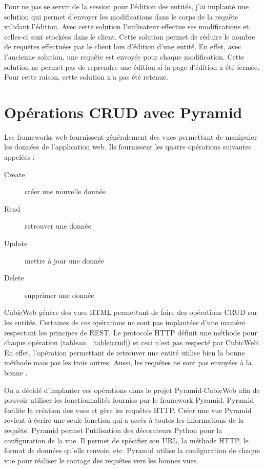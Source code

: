 Pour ne pas se servir de la session pour l'édition des entités, j'ai implanté
une solution qui permet d'envoyer les modifications dans le corps de la requête
validant l'édition. Avec cette solution l'utilisateur effectue ses
modifications et celles-ci sont stockées dans le client. Cette solution permet
de réduire le nombre de requêtes effectuées par le client lors d'édition d'une
entité. En effet, avec l'ancienne solution, une requête est envoyée pour chaque
modification. Cette solution ne permet pas de reprendre une édition si la page
d'édition a été fermée. Pour cette raison, cette solution n'a pas été retenue.

\section{Opérations CRUD avec Pyramid} Les frameworks web fournissent
généralement des vues permettant de manipuler les données de l'application web.
Ils fournissent les quatre opérations suivantes appelées  :

\begin{description} 
    \item[Create] créer une nouvelle donnée 
    \item[Read] retrouver une donnée 
    \item[Update] mettre à jour une donnée 
    \item[Delete] supprimer une donnée 
\end{description}

CubicWeb génère des vues HTML permettant de faire des opérations CRUD sur les
entités. Certaines de ces opérations ne sont pas implantées d'une manière
respectant les principes de REST. Le protocole HTTP définit une méthode pour
chaque opération (tableau ~\ref{table:crud}) et ceci n'est pas respecté par
CubicWeb. En effet, l'opération permettant de retrouver une entité utilise bien
la bonne méthode mais pas les trois autres. Aussi, les requêtes ne sont pas
envoyées à la bonne .

On a décidé d'implanter ces opérations dans le projet Pyramid-CubicWeb afin
de pouvoir utiliser les fonctionnalités fournies par le framework Pyramid.
Pyramid facilite la création des vues et gère les requêtes HTTP. Créer une vue
Pyramid revient à écrire une seule fonction qui a accès à toutes les
informations de la requête. Pyramid permet l'utilisation des décorateurs Python
pour la configuration de la vue. Il permet de spécifier son URL, la méthode
HTTP, le format de données qu'elle renvoie, etc. Pyramid utilise la
configuration de chaque vue pour réaliser le routage des requêtes vers les
bonnes vues. 

